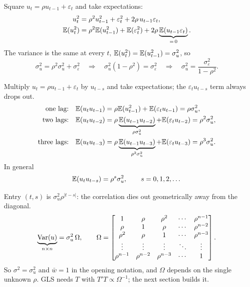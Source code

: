 \documentclass[11pt]{article}
\begin{document}
Square $u_{t} = \rho u_{t-1} + \varepsilon_{t}$ and take expectations:
\begin{align*}
  u_{t}^{2} &= \rho^{2}u_{t-1}^{2} + \varepsilon_{t}^{2} + 2\rho\,u_{t-1}\varepsilon_{t},\\
  \mathbb{E}(u_{t}^{2}) &= \rho^{2}\mathbb{E}(u_{t-1}^{2}) + \mathbb{E}(\varepsilon_{t}^{2})
                   + 2\rho\underbrace{\mathbb{E}(u_{t-1}\varepsilon_{t})}_{=\,0}.
\end{align*}
The variance is the same at every $t$, $\mathbb{E}(u_{t}^{2}) = \mathbb{E}(u_{t-1}^{2}) = \sigma_{u}^{2}$,
so
\[ \sigma_{u}^{2} = \rho^{2}\sigma_{u}^{2} + \sigma_{\varepsilon}^{2}
   \quad\Longrightarrow\quad \sigma_{u}^{2}(1 - \rho^{2}) = \sigma_{\varepsilon}^{2}
   \quad\Longrightarrow\quad \sigma_{u}^{2} = \frac{\sigma_{\varepsilon}^{2}}{1 - \rho^{2}}. \]

Multiply $u_{t} = \rho u_{t-1} + \varepsilon_{t}$ by $u_{t-s}$ and take expectations;
the $\varepsilon_{t}u_{t-s}$ term always drops out.
\begin{align*}
  \text{one lag:}\quad
  \mathbb{E}(u_{t}u_{t-1}) &= \rho\mathbb{E}(u_{t-1}^{2}) + \mathbb{E}(\varepsilon_{t}u_{t-1})
                    = \rho\sigma_{u}^{2},\\
  \text{two lags:}\quad
  \mathbb{E}(u_{t}u_{t-2}) &= \rho\underbrace{\mathbb{E}(u_{t-1}u_{t-2})}_{\rho\sigma_{u}^{2}}
                      + \mathbb{E}(\varepsilon_{t}u_{t-2})
                    = \rho^{2}\sigma_{u}^{2},\\
  \text{three lags:}\quad
  \mathbb{E}(u_{t}u_{t-3}) &= \rho\underbrace{\mathbb{E}(u_{t-1}u_{t-3})}_{\rho^{2}\sigma_{u}^{2}}
                      + \mathbb{E}(\varepsilon_{t}u_{t-3})
                    = \rho^{3}\sigma_{u}^{2}.
\end{align*}
In general
\[ \mathbb{E}(u_{t}u_{t-s}) = \rho^{s}\sigma_{u}^{2}, \qquad s = 0, 1, 2, \dots \]

Entry $(t,s)$ is $\sigma_{u}^{2}\rho^{|t-s|}$: the correlation dies out geometrically
away from the diagonal.
\[ \underbrace{\operatorname{Var}(u)}_{n\times n} = \sigma_{u}^{2}\,\Omega, \qquad
   \Omega = \begin{bmatrix}
     1          & \rho       & \rho^{2}   & \cdots & \rho^{n-1}\\
     \rho       & 1          & \rho       & \cdots & \rho^{n-2}\\
     \rho^{2}   & \rho       & 1          & \cdots & \rho^{n-3}\\
     \vdots     & \vdots     & \vdots     & \ddots & \vdots\\
     \rho^{n-1} & \rho^{n-2} & \rho^{n-3} & \cdots & 1
   \end{bmatrix}. \]
So $\sigma^{2} = \sigma_{u}^{2}$ and $\bar w = 1$ in the opening notation, and $\Omega$
depends on the single unknown $\rho$. GLS needs $T$ with $T'T \propto \Omega^{-1}$;
the next section builds it.
\end{document}
